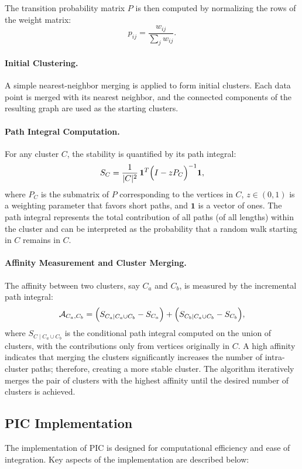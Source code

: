 The transition probability matrix $P$ is then computed by normalizing the rows of the weight matrix:
\[
p_{ij} = \frac{w_{ij}}{\sum_{j} w_{ij}}.
\]

\paragraph{Initial Clustering.}  
A simple nearest-neighbor merging is applied to form initial clusters. Each data point is merged with its nearest neighbor, and the connected components of the resulting graph are used as the starting clusters.

\paragraph{Path Integral Computation.}  
For any cluster $C$, the stability is quantified by its path integral:
\[
S_C = \frac{1}{|C|^2} \, \mathbf{1}^T \Bigl(I - zP_C\Bigr)^{-1} \mathbf{1},
\]
where $P_C$ is the submatrix of $P$ corresponding to the vertices in $C$, $z\in(0,1)$ is a weighting parameter that favors short paths, and $\mathbf{1}$ is a vector of ones. The path integral represents the total contribution of all paths (of all lengths) within the cluster and can be interpreted as the probability that a random walk starting in $C$ remains in $C$.

\paragraph{Affinity Measurement and Cluster Merging.}  
The affinity between two clusters, say $C_a$ and $C_b$, is measured by the incremental path integral:
\[
\mathcal{A}_{C_a, C_b} = \Bigl(S_{C_a \mid C_a\cup C_b} - S_{C_a}\Bigr) + \Bigl(S_{C_b \mid C_a\cup C_b} - S_{C_b}\Bigr),
\]
where $S_{C \mid C_a\cup C_b}$ is the conditional path integral computed on the union of clusters, with the contributions only from vertices originally in $C$. A high affinity indicates that merging the clusters significantly increases the number of intra-cluster paths; therefore, creating a more stable cluster. The algorithm iteratively merges the pair of clusters with the highest affinity until the desired number of clusters is achieved.

\subsection{PIC Implementation}
The implementation of PIC is designed for computational efficiency and ease of integration. Key aspects of the implementation are described below:

